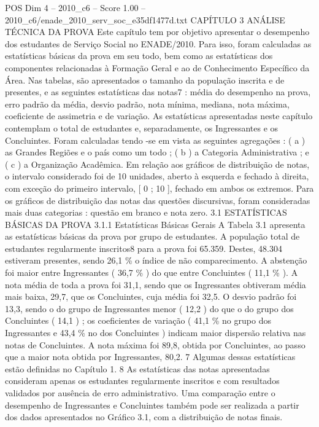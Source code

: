 \begin{textsample}{POS Dim 4 – 2010\_c6 – Score 1.00 – 2010\_c6/enade\_2010\_serv\_soc\_e35df1477d.txt}  \label{ex:f4_pos_309}
CAPÍTULO 3 ANÁLISE TÉCNICA DA PROVA Este capítulo tem por objetivo apresentar o desempenho dos estudantes de Serviço Social no ENADE/2010.
Para isso, foram calculadas as estatísticas básicas da prova em seu todo, bem como as estatísticas dos componentes relacionadas à Formação Geral e ao de Conhecimento Específico da Área.
Nas tabelas, são apresentados o tamanho da população inscrita e de presentes, e as seguintes estatísticas das notas7 : média do desempenho na prova, erro padrão da média, desvio padrão, nota mínima, mediana, nota máxima, coeficiente de assimetria e de variação.
As estatísticas apresentadas neste capítulo contemplam o total de estudantes e, separadamente, os Ingressantes e os Concluintes.
Foram calculadas tendo -se em vista as seguintes agregações : ( a ) as Grandes Regiões e o país como um todo ; ( b ) a Categoria Administrativa ; e ( c ) a Organização Acadêmica.
Em relação aos gráficos de distribuição de notas, o intervalo considerado foi de 10 unidades, aberto à esquerda e fechado à direita, com exceção do primeiro intervalo, [ 0 ; 10 ], fechado em ambos os extremos.
Para os gráficos de distribuição das notas das questões discursivas, foram consideradas mais duas categorias : questão em branco e nota zero. 3.1 ESTATÍSTICAS BÁSICAS DA PROVA 3.1.1 Estatísticas Básicas Gerais A Tabela 3.1 apresenta as estatísticas básicas da prova por grupo de estudantes.
A população total de estudantes regularmente inscritos8 para a prova foi 65.359.
Destes, 48.304 estiveram presentes, sendo 26,1 \% o índice de não comparecimento.
A abstenção foi maior entre Ingressantes ( 36,7 \% ) do que entre Concluintes ( 11,1 \% ).
A nota média de toda a prova foi 31,1, sendo que os Ingressantes obtiveram média mais baixa, 29,7, que os Concluintes, cuja média foi 32,5.
O desvio padrão foi 13,3, sendo o do grupo de Ingressantes menor ( 12,2 ) do que o do grupo dos Concluintes ( 14,1 ) ; os coeficientes de variação ( 41,1 \% no grupo dos Ingressantes e 43,4 \% no dos Concluintes ) indicam maior dispersão relativa nas notas de Concluintes.
A nota máxima foi 89,8, obtida por Concluintes, ao passo que a maior nota obtida por Ingressantes, 80,2. 7 Algumas dessas estatísticas estão definidas no Capítulo 1. 8 As estatísticas das notas apresentadas consideram apenas os estudantes regularmente inscritos e com resultados validados por ausência de erro administrativo.
Uma comparação entre o desempenho de Ingressantes e Concluintes também pode ser realizada a partir dos dados apresentados no Gráfico 3.1, com a distribuição de notas finais.

\end{textsample}
